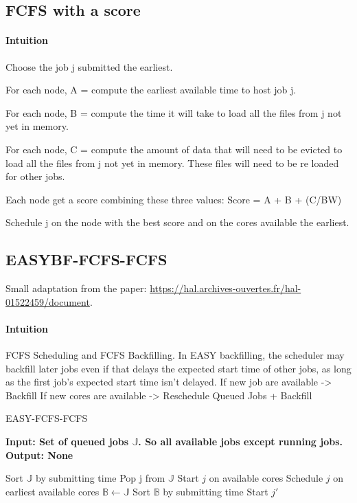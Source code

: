 \documentclass[a4paper]{article}
\newcommand{\jobset}{\ensuremath{\mathbb{J}}\xspace}
\begin{document}
\subsection{FCFS with a score}
\paragraph{Intuition}
Choose the job j submitted the earliest.

For each node, A = compute the earliest available time to host job j.

For each node, B = compute the time it will take to load all the files from j not yet in memory.

For each node, C = compute the amount of data that will need to be evicted to load all the files from j not yet in memory. These files will need to be re loaded for other jobs.

Each node get a score combining these three values: Score = A + B + (C/BW)

Schedule j on the node with the best score and on the cores available the earliest.

\subsection{EASYBF-FCFS-FCFS}
Small adaptation from the paper: \url{https://hal.archives-ouvertes.fr/hal-01522459/document}.
\paragraph{Intuition}
FCFS Scheduling and FCFS Backfilling.
In EASY backfilling, the scheduler may backfill later jobs even if that delays the expected start time of other jobs, as long as the first job's expected start time isn't delayed. 
If new job are available -> Backfill
If new cores are available -> Reschedule Queued Jobs + Backfill
\begin{algorithm}[H]
\caption{EASY-FCFS-FCFS}
\hspace*{\algorithmicindent} \textbf{Input: Set of queued jobs $\jobset$. So all available jobs except running jobs.} \\
\hspace*{\algorithmicindent} \textbf{Output: None}
\begin{algorithmic}[1]
\State Sort $\jobset$ by submitting time
\State Pop j from $\jobset$
	\State Start $j$ on available cores
\Else
	\State Schedule $j$ on earliest available cores 
	\State $\mathbb{B} \gets \jobset$
	\State Sort $\mathbb{B}$ by submitting time 
		 
			\State Start $j'$
		\EndIf
	\EndFor
\EndIf		
\end{algorithmic}
\end{algorithm}
\end{document}

